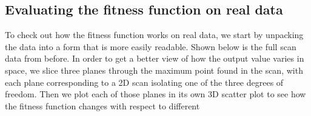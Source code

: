 \documentclass[11pt]{article}
\begin{document}
\subsection{Evaluating the fitness function on real data}
To check out how the fitness function works on real data, we start by unpacking the data into a form that is more easily readable. Shown below is the full scan data from before. In order to get a better view of how the output value varies in space, we slice three planes through the maximum point found in the scan, with each plane corresponding to a 2D scan isolating one of the three degrees of freedom.
Then we plot each of those planes in its own 3D scatter plot to see how the fitness function changes with respect to different 
\begin{center}
    \begin{tikzpicture}[
        node distance=1.5cm,
        shorten >= 2pt,
        shorten <= 2pt,
        arrow/.style={
        ->,
        line width=2pt
        }]
        

\end{tikzpicture}
\end{center}
\end{document}

